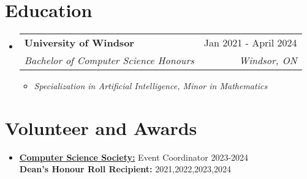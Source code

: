\documentclass[letterpaper,11pt]{article}
\makeatletter
\newcommand{\resumeItem}[1]{
  \item\small{
    {#1 \vspace{-2pt}}
  }
}
\newcommand{\resumeSubheading}[4]{
  \vspace{-2pt}\item
    \begin{tabular*}{0.97\textwidth}[t]{l@{\extracolsep{\fill}}r}
      \textbf{#1} & #2 \\
      \textit{\small#3} & \textit{\small #4} \\
    \end{tabular*}\vspace{-7pt}
}
\newcommand{\resumeSubHeadingListStart}{\begin{itemize}[leftmargin=0.15in, label={}]}
\newcommand{\resumeSubHeadingListEnd}{\end{itemize}}
\newcommand{\resumeItemListStart}{\begin{itemize}}
\newcommand{\resumeItemListEnd}{\end{itemize}\vspace{-5pt}}
\makeatother
\begin{document}
  \section{Education}
  \resumeSubHeadingListStart
    \resumeSubheading
      {University of Windsor}{Jan 2021 - April 2024}
      {Bachelor of Computer Science Honours}{Windsor, ON}
    \resumeItemListStart
      \resumeItem{\textit{Specialization in Artificial Intelligence, Minor in Mathematics}}
    \resumeItemListEnd
    
  \resumeSubHeadingListEnd  

\section{Volunteer and Awards}
 \begin{itemize}[leftmargin=0.15in, label={}]
    \small\item{
     {\href{https://css.uwindsor.ca}{\textbf{Computer Science Society:}} {Event Coordinator 2023-2024} \\
     \textbf{Dean's Honour Roll Recipient:} {2021,2022,2023,2024} \\
    }}
\end{itemize}

\end{document}
